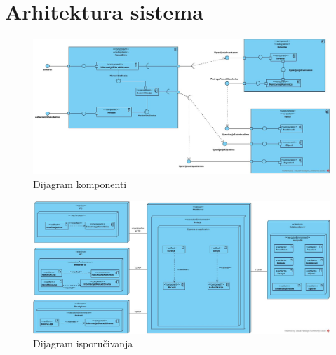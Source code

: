 \section{\bfseries Arhitektura sistema}





\begin{figure}[H]
	\begin{center}
		\includegraphics[width=\textwidth]{Pictures/component_diagram.jpg}
    		\caption{Dijagram komponenti}
    \label{fig:ClassDiagramDatabase}
    \end{center}
\end{figure}


\begin{figure}[H]
	\begin{center}
		\includegraphics[width=\textwidth]{Pictures/deployment_diagram.jpg}
    		\caption{Dijagram isporučivanja}
    \label{fig:ClassDiagramDatabase}
    \end{center}
\end{figure}